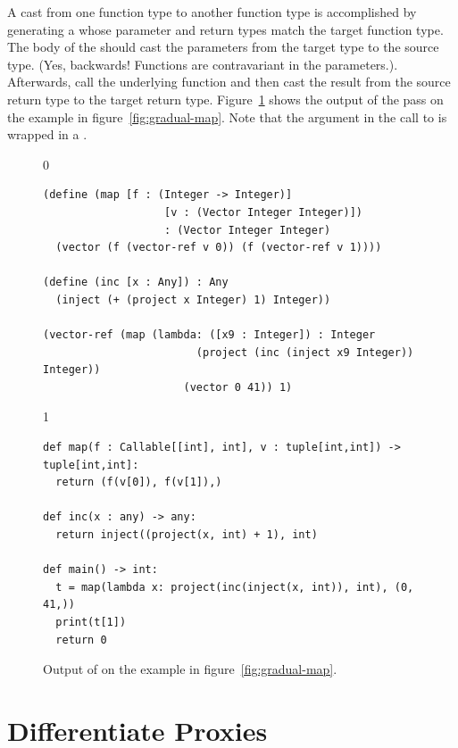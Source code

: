 \documentclass[7x10]{TimesAPriori_MIT}%
\def\racketEd{0}
\def\pythonEd{1}
\def\edition{0}
\numberwithin{theorem}{chapter}
\numberwithin{definition}{chapter}
\numberwithin{equation}{chapter}
\begin{document}
A cast from one function type to another function type is accomplished
by generating a  whose parameter and return types match
the target function type. The body of the  should cast
the parameters from the target type to the source type. (Yes,
backwards! Functions are contravariant
in the parameters.). Afterwards, call the underlying function and then
cast the result from the source return type to the target return type.
Figure~\ref{fig:map-lower-cast} shows the output of the
 pass on the  example in
figure~\ref{fig:gradual-map}. Note that the  argument in the
call to  is wrapped in a .

\begin{figure}[tbp]
\begin{tcolorbox}[colback=white]  
{\if\edition\racketEd    
\begin{lstlisting}
(define (map [f : (Integer -> Integer)]
                   [v : (Vector Integer Integer)])
                   : (Vector Integer Integer)
  (vector (f (vector-ref v 0)) (f (vector-ref v 1))))

(define (inc [x : Any]) : Any
  (inject (+ (project x Integer) 1) Integer))

(vector-ref (map (lambda: ([x9 : Integer]) : Integer
                        (project (inc (inject x9 Integer)) Integer))
                      (vector 0 41)) 1)
\end{lstlisting}
\fi}
{\if\edition\pythonEd
\begin{lstlisting}[basicstyle=\ttfamily\footnotesize]
def map(f : Callable[[int], int], v : tuple[int,int]) -> tuple[int,int]:
  return (f(v[0]), f(v[1]),)

def inc(x : any) -> any:
  return inject((project(x, int) + 1), int)

def main() -> int:
  t = map(lambda x: project(inc(inject(x, int)), int), (0, 41,))
  print(t[1])
  return 0
\end{lstlisting}
\fi}
\end{tcolorbox}

\caption{Output of  on the example in
  figure~\ref{fig:gradual-map}.}
\label{fig:map-lower-cast}
\end{figure}


\section{Differentiate Proxies}
\label{sec:differentiate-proxies}
\end{document}
